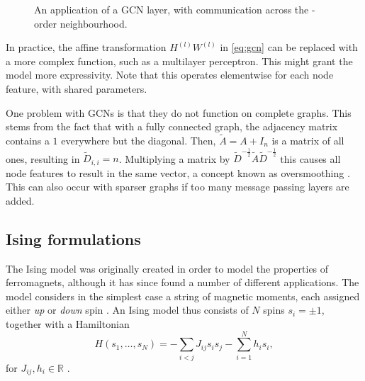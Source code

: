 \begin{figure}[!h]
    \centering
    \resizebox{!}{4cm}{}
    \caption{An application of a GCN layer, with communication across the -order neighbourhood.}
    \label{fig:gcn}
\end{figure}

In practice, the affine transformation $H^{(l)} W^{(l)}$ in \eqref{eq:gcn} can be replaced with a more complex function, such as a multilayer perceptron.
This might grant the model more expressivity.
Note that this operates elementwise for each node feature, with shared parameters.

One problem with GCNs is that they do not function on complete graphs.
This stems from the fact that with a fully connected graph, the adjacency matrix contains a $1$ everywhere but the diagonal.
Then, $\tilde{A} = A + I_n$ is a matrix of all ones, resulting in $\tilde{D}_{i,i} = n$.
Multiplying a matrix by $\tilde{D}^{-\frac{1}{2}} \tilde{A} \tilde{D}^{-\frac{1}{2}}$ this causes all node features to result in the same vector, a concept known as oversmoothing \cite{oversmoothing}.
This can also occur with sparser graphs if too many message passing layers are added.

\subsection{Ising formulations}
The Ising model was originally created in order to model the properties of ferromagnets, although it has since found a number of different applications.
The model considers in the simplest case a string of magnetic moments, each assigned either \textit{up} or \textit{down} spin \cite{isingModel}.
An Ising model thus consists of $N$ spins $s_i = \pm 1$, together with a Hamiltonian
\begin{equation}\label{eq:hamiltonian}
    H(s_1, \ldots, s_N) = - \sum_{i < j} J_{ij} s_i s_j - \sum_{i = 1}^N h_i s_i,
\end{equation}
for $J_{ij}, h_i \in \mathbb{R}$ \cite{IsingFormulations}.

